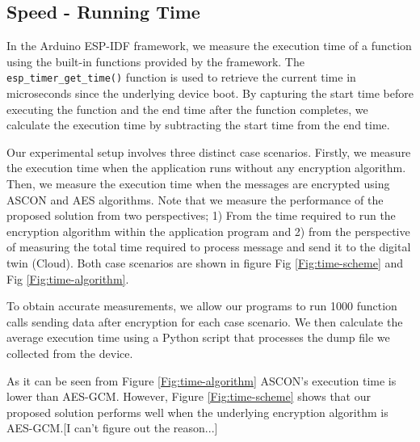 \subsection{Speed - Running Time}
% 
In the Arduino ESP-IDF framework, we measure the execution time of a function using the built-in functions provided by the framework. The \texttt{esp\_timer\_get\_time()} function is used to retrieve the current time in microseconds since the underlying device boot. By capturing the start time before executing the function and the end time after the function completes, we calculate the execution time by subtracting the start time from the end time.

Our experimental setup involves three distinct case scenarios. Firstly, we measure the execution time when the application runs without any encryption algorithm. Then, we measure the execution time when the messages are encrypted using ASCON and AES algorithms. Note that we measure the performance of the proposed solution from two perspectives; 1) From the time required to run the encryption algorithm within the application program and 2) from the perspective of measuring the total time required to process message and send it to the digital twin (Cloud). Both case scenarios are shown in figure Fig \ref{Fig:time-scheme} and Fig \ref{Fig:time-algorithm}. 

To obtain accurate measurements, we allow our programs to run 1000 function calls sending data after encryption for each case scenario. We then calculate the average execution time using a Python script that processes the dump file we collected from the device.

As it can be seen from Figure \ref{Fig:time-algorithm} ASCON's execution time is lower than AES-GCM. However, Figure \ref{Fig:time-scheme} shows that our proposed solution performs well when the underlying encryption algorithm is AES-GCM.[I can't figure out the reason...]

